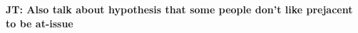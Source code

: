 \documentclass[11pt,fleqn]{article}
\newcommand{\6}{\mbox{$[\hspace*{-.6mm}[$}}
\newcommand{\9}{\mbox{$]\hspace*{-.6mm}]$}}
\newcommand{\jt}[1]{\textbf{\color{blue}JT: #1}}
\begin{document}
%
%
%
%
%
%

\jt{Also talk about hypothesis that some people don't like prejacent to be at-issue}
\end{document}
